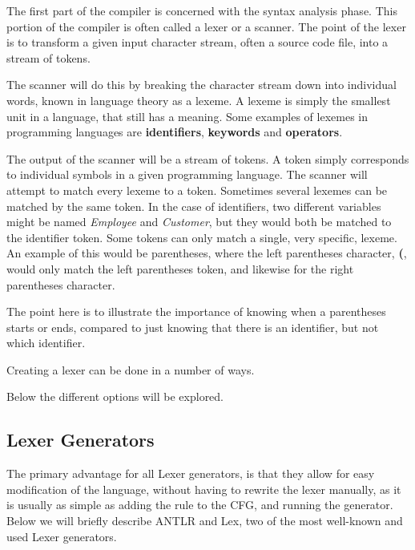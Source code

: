 The first part of the compiler is concerned with the syntax analysis phase.
This portion of the compiler is often called a lexer or a scanner.
The point of the lexer is to transform a given input character stream, often a source code file, into a stream of tokens.

The scanner will do this by breaking the character stream down into individual words, known in language theory as a lexeme.
A lexeme is simply the smallest unit in a language, that still has a meaning.
Some examples of lexemes in programming languages are \textbf{identifiers}, \textbf{keywords} and \textbf{operators}.

The output of the scanner will be a stream of tokens.
A token simply corresponds to individual symbols in a given programming language.
The scanner will attempt to match every lexeme to a token.
Sometimes several lexemes can be matched by the same token.
In the case of identifiers, two different variables might be named \textit{Employee} and \textit{Customer}, but they would both be matched to the identifier token.
Some tokens can only match a single, very specific, lexeme.
An example of this would be parentheses, where the left parentheses character, \textbf{(}, would only match the left parentheses token, and likewise for the right parentheses character.

The point here is to illustrate the importance of knowing when a parentheses starts or ends, compared to just knowing that there is an identifier, but not which identifier.

Creating a lexer can be done in a number of ways.

Below the different options will be explored.
\subsection{Lexer Generators}
The primary advantage for all Lexer generators, is that they allow for easy modification of the language, without having to  rewrite the lexer manually, as it is usually as simple as adding the rule to the CFG, and running the generator.
Below we will briefly describe ANTLR and Lex, two of the most well-known and used Lexer generators.

